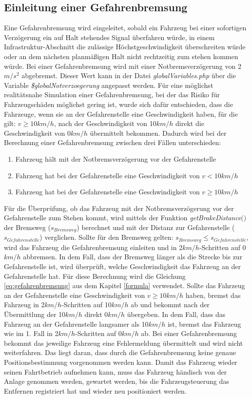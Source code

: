 \subsection{Einleitung einer Gefahrenbremsung} \label{notbremsung}
Eine Gefahrenbremsung wird eingeleitet, sobald ein Fahrzeug bei einer sofortigen Verzögerung ein auf Halt stehendes Signal überfahren würde, in einem Infrastruktur-Abschnitt die zulässige Höchstgeschwindigkeit überschreiten würde oder an dem nächsten planmäßigen Halt nicht rechtzeitig zum stehen kommen würde. Bei einer Gefahrenbremsung wird mit einer Notbremsverzögerung von 2$m/s^2$ abgebremst. Dieser Wert kann in der Datei \textit{globalVariables.php} über die Variable \textit{\$globalNotverzoegerung} angepasst werden. Für eine möglichst realitätsnahe Simulation einer Gefahrenbremsung, bei der das Risiko für Fahrzeugschäden möglichst gering ist, wurde sich dafür entschieden, dass die Fahrzeuge, wenn sie an der Gefahrenstelle eine Geschwindigkeit haben, für die gilt: $v\geq10km/h$, nach der Geschwindigkeit von 10$km/h$ direkt die Geschwindigkeit von 0$km/h$ übermittelt bekommen. Dadurch wird bei der Berechnung einer Gefahrenbremsung zwischen drei Fällen unterschieden:
\begin{enumerate}
\item Fahrzeug hält mit der Notbremsverzögerung vor der Gefahrenstelle
\item Fahrzeug hat bei der Gefahrenstelle eine Geschwindigkeit von $v<10km/h$
\item Fahrzeug hat bei der Gefahrenstelle eine Geschwindigkeit von $v\geq10km/h$
\end{enumerate}
Für die Überprüfung, ob das Fahrzeug mit der Notbremsverzögerung vor der Gefahrenstelle zum Stehen kommt, wird mittels der Funktion \textit{getBrakeDistance$($$)$} der Bremsweg ($s_{Bremsweg}$) berechnet und mit der Distanz zur Gefahrenstelle ($s_{Gefahrenstelle}$) verglichen. Sollte für den Bremsweg gelten: $s_{Bremsweg}\leq s_{Gefahrenstelle}$, wird das Fahrzeug die Gefahrenbremsung einleiten und in 2$km/h$-Schritten auf 0$km/h$ abbremsen. In dem Fall, dass der Bremsweg länger als die Strecke bis zur Gefahrenstelle ist, wird überprüft, welche Geschwindigkeit das Fahrzeug an der Gefahrenstelle hat. Für diese Berechnung wird die Gleichung \ref{eq:gefahrenbremsung} aus dem Kapitel \ref{formula} verwendet. Sollte das Fahrzeug an der Gefahrenstelle eine Geschwindigkeit von $v\geq10km/h$ haben, bremst das Fahrzeug in 2$km/h$-Schritten auf 10$km/h$ ab und bekommt nach der Übermittlung der 10$km/h$ direkt 0$km/h$ übergeben. In dem Fall, dass das Fahrzeug an der Gefahrenstelle langsamer als 10$km/h$ ist, bremst das Fahrzeug wie im 1. Fall in 2$km/h$-Schritten auf 0$km/h$ ab. Bei einer Gefahrenbremsung bekommt das jeweilige Fahrzeug eine Fehlermeldung übermittelt und wird nicht weiterfahren. Das liegt daran, dass durch die Gefahrenbremsung keine genaue Positionsbestimmung vorgenommen werden kann. Damit das Fahrzeug wieder seinen Fahrtbetrieb aufnehmen kann, muss das Fahrzeug händisch von der Anlage genommen werden, gewartet werden, bis die Fahrzeugsteuerung das Entfernen registriert hat und wieder neu positioniert werden.